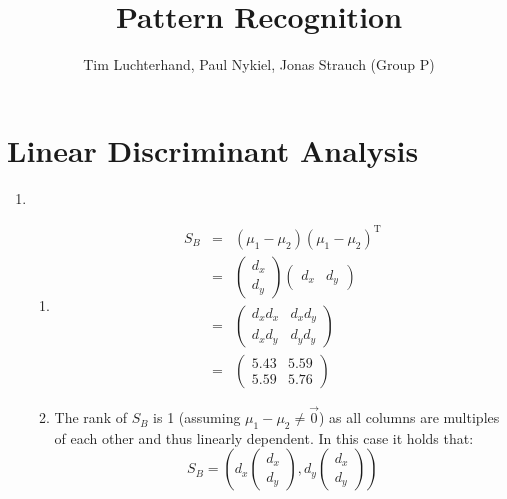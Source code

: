 \documentclass[DIN, pagenumber=false, fontsize=11pt, parskip=half]{scrartcl}
\title{Pattern Recognition}
\author{Tim Luchterhand, Paul Nykiel, Jonas Strauch (Group P)}
\begin{document}
    \maketitle
    \section{Linear Discriminant Analysis}
    \begin{enumerate}
        \item 
            \begin{enumerate}[label=\alph*)]
                \item
                    \begin{eqnarray*}
                        S_B &=& (\mu_1 - \mu_2) {(\mu_1 - \mu_2)}^\text{T} \\
                            &=& 
                                \begin{pmatrix}
                                    d_x \\ d_y
                                \end{pmatrix}
                                \begin{pmatrix}
                                    d_x & d_y
                                \end{pmatrix}\\
                            &=&
                                \begin{pmatrix}
                                    d_x d_x & d_x d_y \\
                                    d_x d_y & d_y d_y
                                \end{pmatrix} \\
                            &=&
                                \begin{pmatrix}
                                    5.43 & 5.59 \\
                                    5.59 & 5.76
                                \end{pmatrix}
                    \end{eqnarray*}
                \item
                    The rank of $S_B$ is 1 (assuming $\mu_1 - \mu_2 \neq \vec{0}$) as all columns are multiples of each other and thus linearly dependent. In this case it holds that:
                    \begin{equation*}
                        S_B =   \left( d_x \begin{pmatrix}  d_x \\ d_y \end{pmatrix}, d_y \begin{pmatrix}  d_x \\ d_y \end{pmatrix} \right)

\end{equation*}
\end{enumerate}
\end{enumerate}
\end{document}
